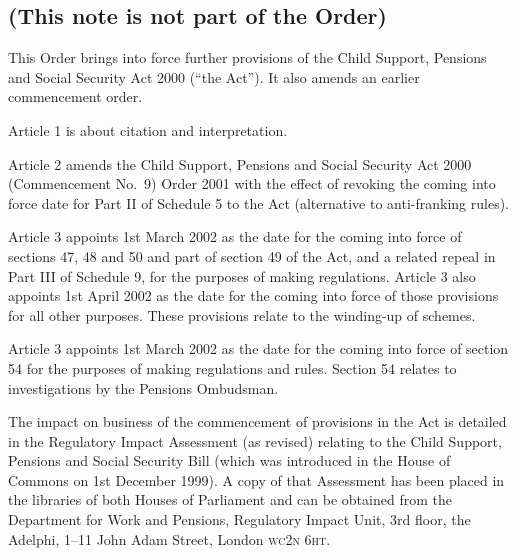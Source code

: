 \documentclass[12pt,a4paper]{article}
\begin{document}
\subsection*{(This note is not part of the Order)}

This Order brings into force further provisions of the Child Support, Pensions and Social Security Act 2000 (“the Act”). It also amends an earlier commencement order.

Article 1 is about citation and interpretation.

Article 2 amends the Child Support, Pensions and Social Security Act 2000 (Commencement No.\ 9) Order 2001 with the effect of revoking the coming into force date for Part II of Schedule 5 to the Act (alternative to anti-franking rules).

Article 3 appoints 1st March 2002 as the date for the coming into force of sections 47, 48 and 50 and part of section 49 of the Act, and a related repeal in Part III of Schedule 9, for the purposes of making regulations. Article 3 also appoints 1st April 2002 as the date for the coming into force of those provisions for all other purposes. These provisions relate to the winding-up of schemes.

Article 3 appoints 1st March 2002 as the date for the coming into force of section 54 for the purposes of making regulations and rules. Section 54 relates to investigations by the Pensions Ombudsman.

The impact on business of the commencement of provisions in the Act is detailed in the Regulatory Impact Assessment (as revised) relating to the Child Support, Pensions and Social Security Bill (which was introduced in the House of Commons on 1st December 1999). A copy of that Assessment has been placed in the libraries of both Houses of Parliament and can be obtained from the Department for Work and Pensions, Regulatory Impact Unit, 3rd floor, the Adelphi, 1--11 John Adam Street, London \textsc{\lowercase{WC2N 6HT}}. 
\end{document}

